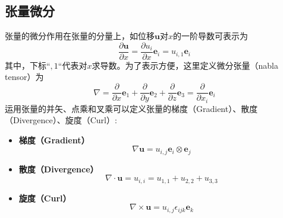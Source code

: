 \subsection{张量微分}
张量的微分作用在张量的分量上，如位移$\boldsymbol u$对$x$的一阶导数可表示为
\begin{equation}
    \frac{\partial \boldsymbol u}{\partial x} = \frac{\partial u_i}{\partial x} \boldsymbol e_i = u_{i,1} \boldsymbol e_i
\end{equation}
其中，下标“$,1$“代表对$x$求导数。为了表示方便，这里定义微分张量（nabla tensor）为
\begin{equation}
    \nabla = \frac{\partial}{\partial x} \boldsymbol e_1 + \frac{\partial}{\partial y} \boldsymbol e_2 + \frac{\partial}{\partial z} \boldsymbol e_3 = \frac{\partial}{\partial x_i} \boldsymbol e_i
\end{equation}
运用张量的并矢、点乘和叉乘可以定义张量的梯度（Gradient）、散度（Divergence）、旋度（Curl）:
\begin{itemize}
    \item \textbf{梯度（Gradient）}
        \begin{equation}
            \nabla \boldsymbol u = u_{i,j} \boldsymbol e_i \otimes \boldsymbol e_j
        \end{equation}
    \item \textbf{散度（Divergence）}
        \begin{equation}
            \nabla \cdot \boldsymbol u = u_{i,i} = u_{1,1} + u_{2,2} + u_{3,3}
        \end{equation}
    \item \textbf{旋度（Curl）}
        \begin{equation}
            \nabla \times \boldsymbol u = u_{i,j} \epsilon_{ijk} \boldsymbol e_k
        \end{equation}
\end{itemize}


